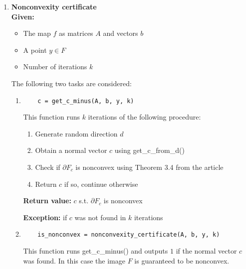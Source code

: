 \documentclass[a4paper]{article}
\theoremstyle{definition}
\begin{document}
\begin{enumerate}
\begin{enumerate}
{\bf Exception:} if optimization task failed

\item \begin{verbatim}
c = get_c_from_d(A, b, y, d)
\end{verbatim}

This function obtains the normal vector $c$ at the boundary point $y+td$ using dual problem (5) from the article.

{\bf Return value:} the normal vector $c$ s.t. $y+td\in\partial G_c$

{\bf Exception:} if optimization task failed
\end{enumerate}

\item {\bf Nonconvexity certificate}\\
{\bf Given:}
\begin{itemize}
	\item The map $f$ as matrices $A$ and vectors $b$
	\item A point $y\in F$
	\item Number of iterations $k$
\end{itemize}
The following two tasks are considered:
\begin{enumerate}
	\item \begin{verbatim}
	c = get_c_minus(A, b, y, k)
	\end{verbatim}
	This function runs $k$ iterations of the following procedure:
	\begin{enumerate}
		\item Generate random direction $d$
		\item Obtain a normal vector $c$ using get\_c\_from\_d()
		\item Check if $\partial F_c$ is nonconvex using Theorem 3.4 from the article
		\item Return $c$ if so, continue otherwise
	\end{enumerate}

	{\bf Return value:}  $c$ s.t. $\partial F_c$ is nonconvex
	
	{\bf Exception:} if $c$ was not found in $k$ iterations
	
	\item \begin{verbatim}
	is_nonconvex = nonconvexity_certificate(A, b, y, k)
	\end{verbatim}
	
	This function runs get\_c\_minus() and outputs $1$ if the normal vector $c$ was found. In this case the image $F$ is guaranteed to be nonconvex.
	

\end{enumerate}
\end{enumerate}
\end{document}
